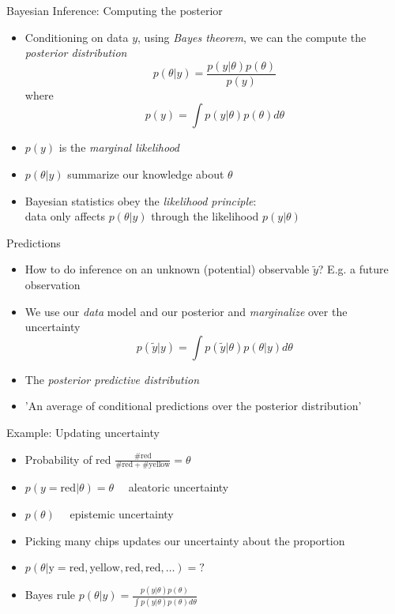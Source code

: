 \documentclass[10pt]{beamer}
\begin{document}
\begin{frame}{Bayesian Inference: Computing the posterior}
  \begin{itemize}
  \item Conditioning on data $y$, using \emph{Bayes theorem}, we can the compute the \emph{posterior distribution}
  \[
  p(\theta|y) = \frac{p(y|\theta) p(\theta)}{p(y)}
  \]
  where
  \[
  p(y) = \int p(y|\theta) p(\theta) d\theta
  \]
  \pause
  \item $p(y)$ is the \emph{marginal likelihood}
  \pause
  \item $p(\theta|y)$ summarize our knowledge about $\theta$
  \pause
  \item Bayesian statistics obey the \emph{likelihood principle}: \\ data only affects $p(\theta|y)$ through the likelihood $p(y|\theta)$
  \end{itemize}
\end{frame}


\begin{frame}{Predictions}
  \begin{itemize}
  \item How to do inference on an unknown (potential) observable $\tilde{y}$? E.g. a future observation
  \pause
  \item We use our \emph{data} model and our posterior and \emph{marginalize} over the uncertainty
  \[
  p(\tilde{y}|y) = \int p(\tilde{y}|\theta) p(\theta|y) d\theta
  \]
  \item The \emph{posterior predictive distribution}
  \item 'An average of conditional predictions over the posterior distribution'
  \end{itemize}
\end{frame}


\begin{frame}{Example: Updating uncertainty}

  \begin{itemize}
  \item<2-> Probability of red $\frac{\mathrm{\#red}}{\mathrm{\#red+\#yellow}}=\theta$
    \vspace{\baselineskip}
  \item<3-> $p(y=\mathrm{red}|\theta)=\theta \quad$ aleatoric uncertainty
    \vspace{\baselineskip}
  \item<4-> $p(\theta) \quad$ epistemic uncertainty
    \vspace{\baselineskip}
  \item<5-> Picking many chips updates our uncertainty about the proportion
    \vspace{\baselineskip}
  \item<5-> $p(\theta|\mathrm{y=red,yellow,red,red,\ldots})=?$
    \vspace{\baselineskip}
  \item<6-> Bayes rule
      $p(\theta|y)=\frac{p(y|\theta)p(\theta)}{\int p(y|\theta)p(\theta) d\theta}$
  \end{itemize}
\end{frame}
\end{document}

